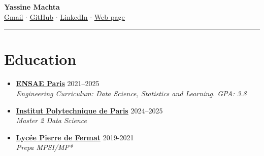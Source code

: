 \documentclass[letterpaper,11pt,twocolumn]{article}
\newcommand{\resumeSubheading}[4]{
	\vspace{-2pt}\item \textbf{#1} \hfill #2 \\
	\textit{\small #3} \hfill \textit{\small #4} 
	\vspace{-7pt}
}
\begin{document}
	
	\begin{center}
		{\LARGE \textbf{Yassine Machta}} \\[5pt]
		\href{mailto:machtayassine@gmail.com}{ \underline{Gmail}} $\cdot$ 
		\href{https://github.com/MachtaYassine}{ \underline{GitHub}} $\cdot$ 
		\href{https://www.linkedin.com/in/yassine-machta-a00307206/}{ \underline{LinkedIn}} $\cdot$ 
		\href{https://machtayassine.github.io}{ \underline{Web page}}
	\end{center}
	
	\vspace{-10pt}
	\hrule
	\vspace{-17pt}
	
	\section{Education}
	\begin{itemize}[leftmargin=*]
		\resumeSubheading
		{\href{https://www.ensae.fr/en}{ENSAE Paris}}{2021--2025}
		{Engineering Curriculum: Data Science, Statistics and Learning. GPA: 3.8}{}
		\resumeSubheading
		{\href{https://www.ip-paris.fr/}{Institut Polytechnique de Paris}}{2024--2025}
		{Master 2 Data Science}{}
        \resumeSubheading
		{\href{https://fermat.mon-ent-occitanie.fr/}{Lycée Pierre de Fermat}}{2019-2021}
		{Prepa MPSI/MP*}{}
	\end{itemize}
	
\end{document}
